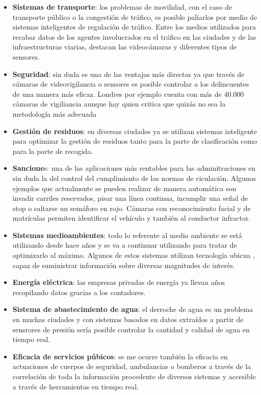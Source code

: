  \begin{itemize}
 	\item \textbf{Sistemas de transporte}: los problemas de movilidad, con el caso de transporte público o la congestión de tráfico, es posible paliarlos por medio de sistemas inteligentes de regulación de tráfico. Entre los medios utilizados para recabar datos de los agentes involucrados en el tráfico en las ciudades y de las infraestructuras viarias, destacan las videocámaras y diferentes tipos de sensores.
 	\item \textbf{Seguridad}: sin duda es una de las ventajas más directas ya que través de cámaras de videovigilancia o sensores es posible controlar a los delincuentes de una manera más eficaz. Londres por ejemplo cuenta con más de 40.000 cámaras de vigiliancia aunque hay quien critica que quizás no sea la metodología más adecuada \cite{london_cameras}
 	\item \textbf{Gestión de residuos}: en diversas ciudades ya se utilizan sistemas inteligente para optimizar la gestión de residuos tanto para la parte de clasificación como para la parte de recogida. \cite{big_data_ciudades_inteligentes}
 	\item \textbf{Sancione}s: una de las aplicaciones más rentables para las adminitraciones en sin duda la del control del cumplimiento de las normas de ciculación. Algunos ejemplos que actualmente se pueden realizar de manera automática son invadir carriles reservados, pisar una línea continua, incumplir una señal de stop o saltarse un semáforo en rojo. Cámaras con reconocimiento facial y de matrículas permiten identificar el vehículo y también al conductor infractor.
 	\item \textbf{Sistemas medioambientes}: todo lo referente al medio ambiente se está utilizando desde hace años y se va a continuar utilizando para tratar de optimizarlo al máximo. Algunos de estos sistemas utilizan tecnología ubicua \cite{tec_ubicua}, capaz de suministrar información sobre diversas magnitudes de interés.
 	\item \textbf{Energía eléctrica}: las empresas privadas de energía ya llevan años recopilando datos gracias a los contadores.
 	\item \textbf{Sistema de abastecimiento de agua}: el derroche de agua es un problema en muchas ciudades y con sistemas basados en datos extraídos a partir de sensrores de presión sería posible controlar la cantidad y calidad de agua en tiempo real.
 	\item \textbf{Eficacia de servicios púbicos}: se me ocurre también la eficacia en actuaciones de cuerpos de seguridad, ambulancias o bomberos a través de la correlación de toda la información procedente de diversos sistemas y accesible a través de herramientas en tiempo real.
 \end{itemize}
 
